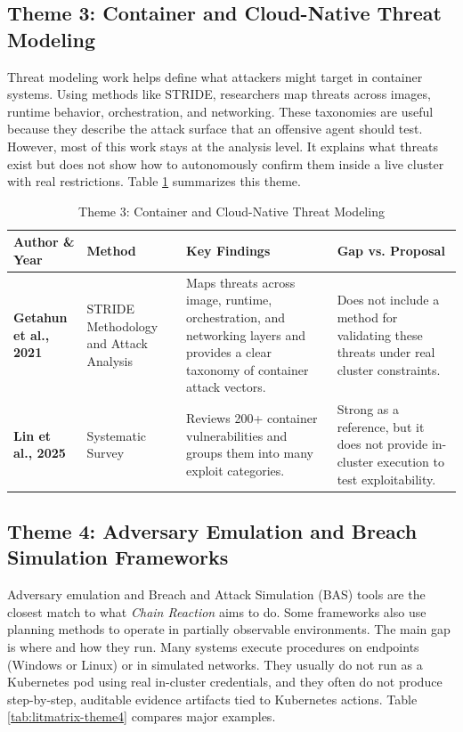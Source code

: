 \documentclass[conference]{IEEEtran}
\begin{document}
\subsection{Theme 3: Container and Cloud-Native Threat Modeling}
Threat modeling work helps define what attackers might target in container systems. Using methods like STRIDE, researchers map threats across images, runtime behavior, orchestration, and networking. These taxonomies are useful because they describe the attack surface that an offensive agent should test. However, most of this work stays at the analysis level. It explains what threats exist but does not show how to autonomously confirm them inside a live cluster with real restrictions. Table \ref{tab:litmatrix-theme3} summarizes this theme.

\begin{table}[t!]
\centering
\caption{Theme 3: Container and Cloud-Native Threat Modeling}
\label{tab:litmatrix-theme3}
\scriptsize
\setlength{\tabcolsep}{5pt}
\renewcommand{\arraystretch}{1.3}
\begin{tabularx}{\textwidth}{l p{2.6cm} X X}
\toprule
\textbf{Author \& Year} & \textbf{Method} & \textbf{Key Findings} & \textbf{Gap vs. Proposal} \\
\midrule
\textbf{Getahun et al., 2021} \cite{getahun2021security} & STRIDE Methodology and Attack Analysis & Maps threats across image, runtime, orchestration, and networking layers and provides a clear taxonomy of container attack vectors. & Does not include a method for validating these threats under real cluster constraints. \\
\addlinespace
\textbf{Lin et al., 2025} \cite{lin2025container} & Systematic Survey & Reviews 200+ container vulnerabilities and groups them into many exploit categories. & Strong as a reference, but it does not provide in-cluster execution to test exploitability. \\
\bottomrule
\end{tabularx}
\end{table}

\subsection{Theme 4: Adversary Emulation and Breach Simulation Frameworks}
Adversary emulation and Breach and Attack Simulation (BAS) tools are the closest match to what \emph{Chain Reaction} aims to do. Some frameworks also use planning methods to operate in partially observable environments. The main gap is where and how they run. Many systems execute procedures on endpoints (Windows or Linux) or in simulated networks. They usually do not run as a Kubernetes pod using real in-cluster credentials, and they often do not produce step-by-step, auditable evidence artifacts tied to Kubernetes actions. Table \ref{tab:litmatrix-theme4} compares major examples.
\end{document}
